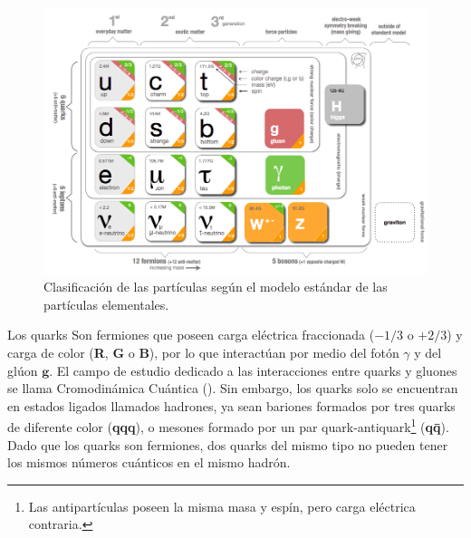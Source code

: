 \begin{figure}[!b]
    \centering
    \includegraphics[width=.8\textwidth]{Cap1/imagenes/standard_model.png}
    \caption{Clasificación de las partículas según el modelo estándar de las partículas elementales.}
    \label{estandar}
\end{figure}


Los quarks Son fermiones que poseen carga eléctrica fraccionada ($- 1/3$ o $+ 2/3$) y carga de color (\textbf{R}, \textbf{G} o \textbf{B}), por lo que interactúan por medio del fotón $\gamma$ y del glúon $\mathbf{g}$. El campo de estudio dedicado a las interacciones entre quarks y gluones se llama Cromodinámica Cuántica (\QCD). Sin embargo, los quarks solo se encuentran en estados ligados llamados hadrones, ya sean bariones formados por tres quarks de diferente color (\textbf{qqq}), o mesones formado por un par quark-antiquark\footnote{Las antipartículas poseen la misma masa y espín, pero carga eléctrica contraria.} (\textbf{q\={q}}). Dado que los quarks son fermiones, dos quarks del mismo tipo no pueden tener los mismos n\'umeros cuánticos en el mismo hadrón.

